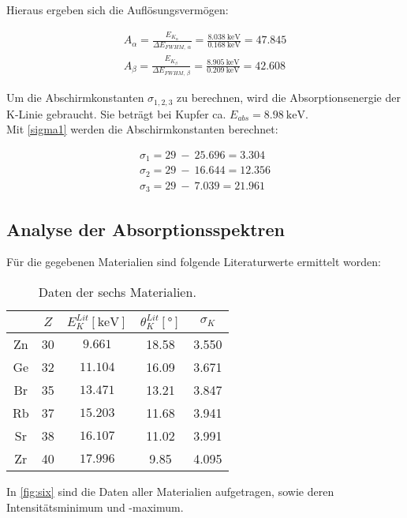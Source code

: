 Hieraus ergeben sich die Auflösungsvermögen:

\begin{align*}
  A_{\alpha} = \frac{E_{K_{\alpha}}}{\Delta E_{FWHM,\ \alpha}} = \frac{\SI{8.038}{\kilo\electronvolt}}{\SI{0.168}{\kilo\electronvolt}} = 47.845\\
  A_{\beta} = \frac{E_{K_{\beta}}}{\Delta E_{FWHM,\ \beta}} = \frac{\SI{8.905}{\kilo\electronvolt}}{\SI{0.209}{\kilo\electronvolt}} = 42.608
\end{align*}

Um die Abschirmkonstanten $\sigma_{1,2,3}$ zu berechnen, wird die Absorptionsenergie der K-Linie gebraucht.
Sie beträgt bei Kupfer ca. $E_{abs} = \SI{8.98}{\kilo\electronvolt}$\cite{nist}.\\
Mit \autoref{sigma1} werden die Abschirmkonstanten berechnet:

\begin{align*}
  \sigma_1 = 29\ -\ 25.696 = 3.304\\
  \sigma_2 = 29\ -\ 16.644 = 12.356\\
  \sigma_3 = 29\ -\ 7.039 = 21.961
\end{align*}
\newpage
\subsection{Analyse der Absorptionsspektren}
Für die gegebenen Materialien sind folgende Literaturwerte ermittelt worden\cite{nist}:

\begin{table}
  \centering
  \caption{Daten der sechs Materialien\cite{nist}.}
  \begin{tabular}{c c c c c}
    \toprule
    $ $ & $Z$ & $E_K^{Lit}[\si{\kilo\electronvolt}]$ & $\theta_K^{Lit}[\si{\degree}]$ & $\sigma_K$\\
    \midrule
    Zn & 30 & $9.661$ & 18.58 & 3.550\\ \hline
    Ge & 32 & $11.104$ & 16.09 & 3.671\\ \hline
    Br & 35 & $13.471$ & 13.21 & 3.847\\ \hline
    Rb & 37 & $15.203$ & 11.68 & 3.941\\ \hline
    Sr & 38 & $16.107$ & 11.02 & 3.991\\ \hline
    Zr & 40 & $17.996$ & 9.85 & 4.095\\
    \bottomrule
  \end{tabular}
  \label{tab:litdata}
\end{table}

In \autoref{fig:six} sind die Daten aller Materialien aufgetragen, sowie deren Intensitätsminimum und -maximum.

